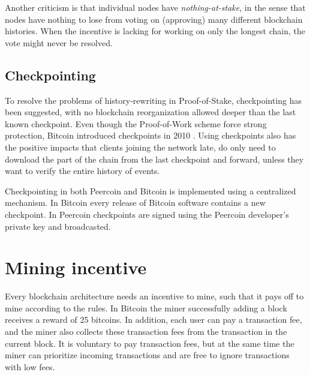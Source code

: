 \documentclass[oneside,a4paper,10pts,article]{memoir}
\begin{document}
Another criticism is that individual nodes have
\textit{nothing-at-stake}, in the sense that nodes have nothing to
lose from voting on (approving) many different blockchain
histories. When the incentive is lacking for working on only the
longest chain, the vote might never be resolved.

\subsection{Checkpointing}
To resolve the problems of history-rewriting in Proof-of-Stake,
checkpointing has been suggested, with no blockchain reorganization
allowed deeper than the last known checkpoint. Even though the
Proof-of-Work scheme force strong protection, Bitcoin introduced
checkpoints in 2010 \cite{king2012ppcoin}. Using checkpoints also has
the positive impacts that clients joining the network late, do only
need to download the part of the chain from the last checkpoint and
forward, unless they want to verify the entire history of events.

Checkpointing in both Peercoin and Bitcoin is implemented using a
centralized mechanism. In Bitcoin every release of Bitcoin software
contains a new checkpoint. In Peercoin checkpoints are signed using
the Peercoin developer's private key and broadcasted.



\section{Mining incentive}
Every blockchain architecture needs an incentive to mine, such that it
pays off to mine according to the rules. In Bitcoin the miner
successfully adding a block receives a reward of 25 bitcoins. In
addition, each user can pay a transaction fee, and the miner also
collects these transaction fees from the transaction in the current
block. It is voluntary to pay transaction fees, but at the same time
the miner can prioritize incoming transactions and are free to ignore
transactions with low fees.
\end{document}
